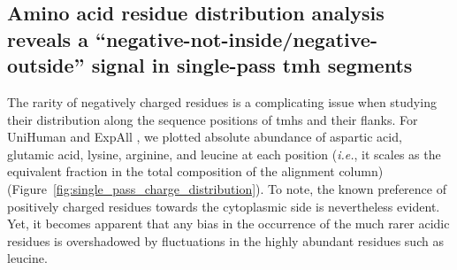 \subsection{Amino acid residue distribution analysis reveals a ``negative-not-inside/negative-outside'' signal in single-pass \gls{tmh} segments}

The rarity of negatively charged residues is a complicating issue when studying their distribution along the sequence positions of \gls{tmh}s and their flanks. For UniHuman and ExpAll , we plotted absolute abundance of aspartic acid, glutamic acid, lysine, arginine, and leucine at each position (\textit{i.e.}, it scales as the equivalent fraction in the total composition of the alignment column) (Figure~\ref{fig:single_pass_charge_distribution}). To note, the known preference of positively charged residues towards the cytoplasmic side is nevertheless evident. Yet, it becomes apparent that any bias in the occurrence of the much rarer acidic residues is overshadowed by fluctuations in the highly abundant residues such as leucine.

